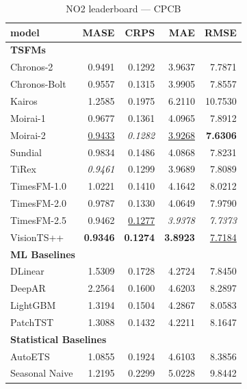 \begin{table}[H]
\caption{NO2 leaderboard --- CPCB}
\centering
\begin{small}
\begin{tabular}{lrrrr}
\toprule
model & MASE & CRPS & MAE & RMSE \\
\midrule
\multicolumn{5}{l}{\textbf{TSFMs}} \\
Chronos-2 & 0.9491 & 0.1292 & 3.9637 & 7.7871 \\
Chronos-Bolt & 0.9557 & 0.1315 & 3.9905 & 7.8557 \\
Kairos & 1.2585 & 0.1975 & 6.2110 & 10.7530 \\
Moirai-1 & 0.9677 & 0.1361 & 4.0965 & 7.8912 \\
Moirai-2 & \underline{0.9433} & \textit{0.1282} & \underline{3.9268} & \textbf{7.6306} \\
Sundial & 0.9834 & 0.1486 & 4.0868 & 7.8231 \\
TiRex & \textit{0.9461} & 0.1299 & 3.9689 & 7.8089 \\
TimesFM-1.0 & 1.0221 & 0.1410 & 4.1642 & 8.0212 \\
TimesFM-2.0 & 0.9787 & 0.1330 & 4.0649 & 7.9790 \\
TimesFM-2.5 & 0.9462 & \underline{0.1277} & \textit{3.9378} & \textit{7.7373} \\
VisionTS++ & \textbf{0.9346} & \textbf{0.1274} & \textbf{3.8923} & \underline{7.7184} \\
\midrule
\multicolumn{5}{l}{\textbf{ML Baselines}} \\
DLinear & 1.5309 & 0.1728 & 4.2724 & 7.8450 \\
DeepAR & 2.2564 & 0.1600 & 4.6203 & 8.2897 \\
LightGBM & 1.3194 & 0.1504 & 4.2867 & 8.0583 \\
PatchTST & 1.3088 & 0.1432 & 4.2211 & 8.1647 \\
\midrule
\multicolumn{5}{l}{\textbf{Statistical Baselines}} \\
AutoETS & 1.0855 & 0.1924 & 4.6103 & 8.3856 \\
Seasonal Naive & 1.2195 & 0.2299 & 5.0228 & 9.8442 \\
\bottomrule
\end{tabular}
\end{small}
\end{table}